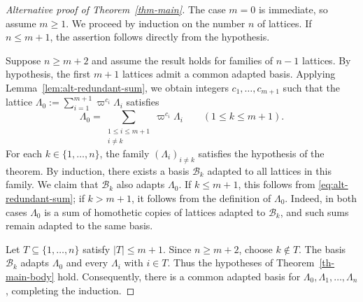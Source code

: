 \documentclass[12pt]{amsart}
\theoremstyle{definition}
\theoremstyle{remark}
\begin{document}
\begin{proof}[Alternative proof of Theorem~\ref{thm-main}]

The case $m=0$ is immediate, so assume $m\geq1$.
We proceed by induction on the number $n$ of lattices. If $n\leq m+1$, the assertion follows directly from the hypothesis.

Suppose $n\geq m+2$ and assume the result holds for
families of $n-1$ lattices. By hypothesis, the first $m+1$ lattices admit a common adapted basis. Applying
Lemma~\ref{lem:alt-redundant-sum}, we obtain integers $c_1,\ldots,c_{m+1}$ such that the lattice 
$
\Lambda_0:=\sum_{i=1}^{m+1}\varpi^{c_i}\Lambda_i
$
satisfies 
\[
\Lambda_0
=\sum_{\substack{1\leq i\leq m+1\\i\neq k}}
\varpi^{c_i}\Lambda_i
\qquad (1\leq k\leq m+1).
\]
For each $k\in\{1,\ldots,n\}$, the family
$(\Lambda_i)_{i\neq k}$ satisfies the hypothesis
of the theorem. By induction, there exists a basis
$\mathcal B_k$ adapted to all lattices in this family. 
We claim that $\mathcal B_k$ also adapts $\Lambda_0$.
If $k\leq m+1$, this follows from \eqref{eq:alt-redundant-sum}; if $k>m+1$, it follows from the definition of $\Lambda_0$. Indeed, in both cases $\Lambda_0$ is a sum of homothetic copies of lattices adapted to $\mathcal B_k$, and such sums remain adapted to the same basis.

Let $T\subseteq\{1,\ldots,n\}$ satisfy $|T|\leq m+1$.
Since $n\geq m+2$, choose $k\notin T$.
The basis $\mathcal B_k$ adapts $\Lambda_0$ and every
$\Lambda_i$ with $i\in T$. Thus the hypotheses of
Theorem~\ref{th-main-body} hold. Consequently, there is a common adapted basis
for $\Lambda_0,\Lambda_1,\ldots,\Lambda_n$, completing
the induction.

\end{proof}
\end{document}

